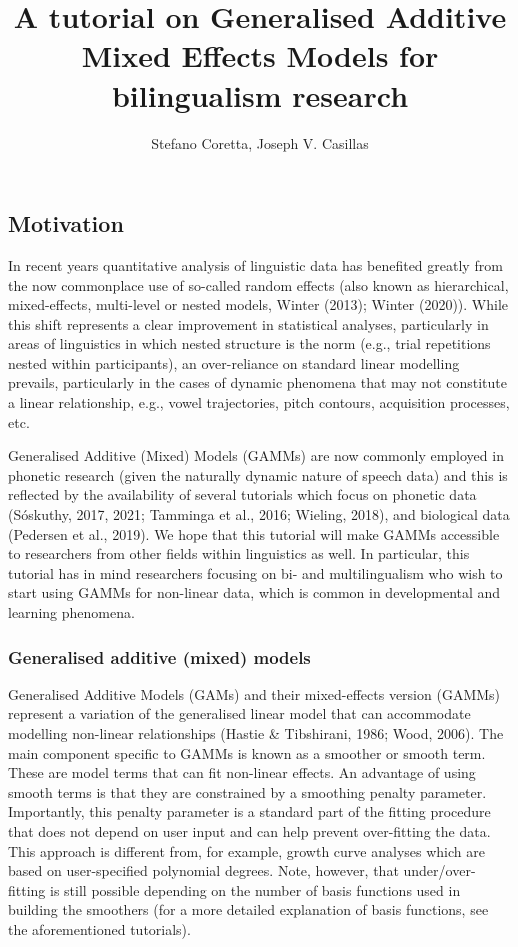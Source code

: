 \documentclass[
  letterpaper,
  DIV=11,
  numbers=noendperiod]{scrartcl}
\title{A tutorial on Generalised Additive Mixed Effects Models for
bilingualism research}
\author{Stefano Coretta, Joseph V. Casillas}
\date{}
\begin{document}
\maketitle

\subsection{Motivation}\label{motivation}

In recent years quantitative analysis of linguistic data has benefited
greatly from the now commonplace use of so-called random effects (also
known as hierarchical, mixed-effects, multi-level or nested models,
Winter (2013); Winter (2020)). While this shift represents a clear
improvement in statistical analyses, particularly in areas of
linguistics in which nested structure is the norm (e.g., trial
repetitions nested within participants), an over-reliance on standard
linear modelling prevails, particularly in the cases of dynamic
phenomena that may not constitute a linear relationship, e.g., vowel
trajectories, pitch contours, acquisition processes, etc.

Generalised Additive (Mixed) Models (GAMMs) are now commonly employed in
phonetic research (given the naturally dynamic nature of speech data)
and this is reflected by the availability of several tutorials which
focus on phonetic data (Sóskuthy, 2017, 2021; Tamminga et al., 2016;
Wieling, 2018), and biological data (Pedersen et al., 2019). We hope
that this tutorial will make GAMMs accessible to researchers from other
fields within linguistics as well. In particular, this tutorial has in
mind researchers focusing on bi- and multilingualism who wish to start
using GAMMs for non-linear data, which is common in developmental and
learning phenomena.

\subsubsection{Generalised additive (mixed)
models}\label{generalised-additive-mixed-models}

Generalised Additive Models (GAMs) and their mixed-effects version
(GAMMs) represent a variation of the generalised linear model that can
accommodate modelling non-linear relationships (Hastie \& Tibshirani,
1986; Wood, 2006). The main component specific to GAMMs is known as a
smoother or smooth term. These are model terms that can fit non-linear
effects. An advantage of using smooth terms is that they are constrained
by a smoothing penalty parameter. Importantly, this penalty parameter is
a standard part of the fitting procedure that does not depend on user
input and can help prevent over-fitting the data. This approach is
different from, for example, growth curve analyses which are based on
user-specified polynomial degrees. Note, however, that
under/over-fitting is still possible depending on the number of basis
functions used in building the smoothers (for a more detailed
explanation of basis functions, see the aforementioned tutorials).
\end{document}
